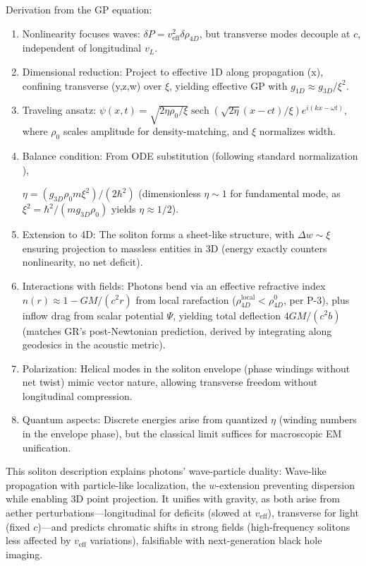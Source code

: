 \documentclass{article}
\DeclareMathOperator{\sech}{sech}
\begin{document}
Derivation from the GP equation:
\begin{enumerate}
    \item Nonlinearity focuses waves: $\delta P = v_{\text{eff}}^2 \delta \rho_{4D}$, but transverse modes decouple at $c$, independent of longitudinal $v_L$.
    \item Dimensional reduction: Project to effective 1D along propagation (x), confining transverse (y,z,w) over $\xi$, yielding effective GP with $g_{1D} \approx g_{3D}/\xi^2$.
    \item Traveling ansatz: $\psi(x,t) = \sqrt{2 \eta \rho_0 / \xi} \sech\left( \sqrt{2 \eta} (x - c t)/ \xi \right) e^{i (k x - \omega t)}$, where $\rho_0$ scales amplitude for density-matching, and $\xi$ normalizes width.
    \item Balance condition: From ODE substitution (following standard normalization \cite{pitaevskii2016bose}),
    
    $\eta = (g_{3D} \rho_0 m \xi^2)/(2\hbar^2)$ (dimensionless $\eta \sim 1$ for fundamental mode, as $\xi^2 = \hbar^2 / (m g_{3D} \rho_0)$ yields $\eta \approx 1/2$).
    \item Extension to 4D: The soliton forms a sheet-like structure, with $\Delta w \sim \xi$ ensuring projection to massless entities in 3D (energy exactly counters nonlinearity, no net deficit).
    \item Interactions with fields: Photons bend via an effective refractive index $n(r) \approx 1 - G M / (c^2 r)$ from local rarefaction ($\rho_{4D}^{\text{local}} < \rho_{4D}^0$, per P-3), plus inflow drag from scalar potential $\Psi$, yielding total deflection $4 G M / (c^2 b)$ (matches GR's post-Newtonian prediction, derived by integrating along geodesics in the acoustic metric).
    \item Polarization: Helical modes in the soliton envelope (phase windings without net twist) mimic vector nature, allowing transverse freedom without longitudinal compression.
    \item Quantum aspects: Discrete energies arise from quantized $\eta$ (winding numbers in the envelope phase), but the classical limit suffices for macroscopic EM unification.
\end{enumerate}

This soliton description explains photons' wave-particle duality: Wave-like propagation with particle-like localization, the $w$-extension preventing dispersion while enabling 3D point projection. It unifies with gravity, as both arise from aether perturbations---longitudinal for deficits (slowed at $v_{\text{eff}}$), transverse for light (fixed $c$)---and predicts chromatic shifts in strong fields (high-frequency solitons less affected by $v_{\text{eff}}$ variations), falsifiable with next-generation black hole imaging.
\end{document}
